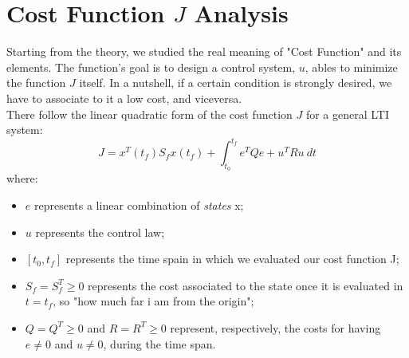 \section{Cost Function $J$ Analysis}
Starting from the theory, we studied the real meaning of "Cost Function" and its elements. The function's goal is to design a control system, $u$, ables to minimize the function $J$ itself. In a nutshell, if a certain condition is strongly desired, we have to associate to it a low cost, and viceversa. \\
There follow the linear quadratic form of the cost function $J$ for a general LTI system:
\begin{equation}
J = x^{T}(t_{f}) S_{f} x(t_{f}) + \int_{t_{0}}^{t_{f}} e^{T} Q e + u^{T} R u \ dt
\end{equation}
where:
\begin{itemize}
	\item $e$ represents a linear combination of \textit{states} x;
	\item $u$ represents the control law;
	\item $ [t_{0},t_{f}] $ represents the time spain in which we evaluated our cost function J;
	\item $ S_{f} = S_{f}^{T} \geq0 $ represents the cost associated to the state once it is evaluated in $t=t_{f}$, so "how much far i am from the origin";
	\item $ Q=Q^{T}\geq 0 $ and $ R=R^{T}\geq 0 $ represent, respectively, the costs for having $e\neq0$ and $u\neq0$, during the time span.
\end{itemize}
